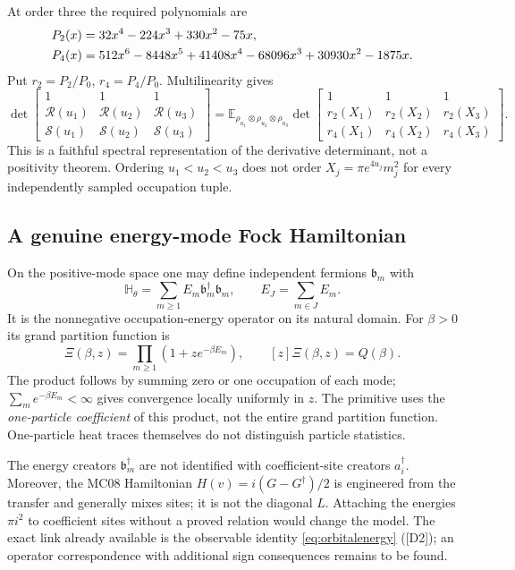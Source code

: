 \documentclass[11pt,letterpaper]{article}
\numberwithin{equation}{section}
\theoremstyle{remark}
\newcommand{\E}{\mathbb E}
\newcommand{\srcR}{\mathscr R}
\newcommand{\srcS}{\mathscr S}
\newcommand{\ev}[1]{\textsf{[#1]}}
\begin{document}
At order three the required polynomials are
\begin{align}
 P_2(x)&=32x^4-224x^3+330x^2-75x,\notag\\
 P_4(x)&=512x^6-8448x^5+41408x^4-68096x^3
                  +30930x^2-1875x. \label{eq:polys}
\end{align}
Put $r_2=P_2/P_0$, $r_4=P_4/P_0$. Multilinearity gives
\begin{equation}
 \det\begin{bmatrix}1&1&1\\\srcR(u_1)&\srcR(u_2)&\srcR(u_3)\\
 \srcS(u_1)&\srcS(u_2)&\srcS(u_3)\end{bmatrix}
 =\E_{\rho_{u_1}\otimes\rho_{u_2}\otimes\rho_{u_3}}
 \det\begin{bmatrix}1&1&1\\r_2(X_1)&r_2(X_2)&r_2(X_3)\\
 r_4(X_1)&r_4(X_2)&r_4(X_3)\end{bmatrix}. \label{eq:threecopy}
\end{equation}
This is a faithful spectral representation of the derivative determinant,
not a positivity theorem. Ordering $u_1<u_2<u_3$ does not order
$X_j=\pi e^{4u_j}m_j^2$ for every independently sampled occupation tuple.

\subsection{A genuine energy-mode Fock Hamiltonian}
On the positive-mode space one may define independent fermions
$\mathfrak b_m$ with
\begin{equation}
 \mathbb H_\theta=\sum_{m\ge1}E_m\mathfrak b_m^\dagger\mathfrak b_m,
 \qquad E_J=\sum_{m\in J}E_m. \label{eq:energyfock}
\end{equation}
It is the nonnegative occupation-energy operator on its natural domain.
For $\beta>0$ its grand partition function is
\begin{equation}
 \Xi(\beta,z)=\prod_{m\ge1}(1+ze^{-\beta E_m}),\qquad
 [z]\Xi(\beta,z)=Q(\beta). \label{eq:grand}
\end{equation}
The product follows by summing zero or one occupation of each mode;
$\sum_m e^{-\beta E_m}<\infty$ gives convergence locally uniformly in
$z$. The primitive uses the \emph{one-particle coefficient} of this
product, not the entire grand partition function. One-particle heat
traces themselves do not distinguish particle statistics.

The energy creators $\mathfrak b_m^\dagger$ are not identified with
coefficient-site creators $a_i^\dagger$. Moreover, the MC08 Hamiltonian
$H(v)=i(G-G^\dagger)/2$ is engineered from the transfer and generally
mixes sites; it is not the diagonal $L$. Attaching the energies
$\pi i^2$ to coefficient sites without a proved relation would change
the model. The exact link already available is the observable identity
\eqref{eq:orbitalenergy} (\ev{D2}); an operator correspondence with
additional sign consequences remains to be found.
\end{document}
